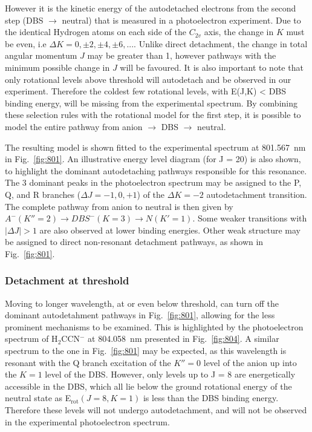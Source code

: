 \documentclass[journal=jpcafh,manuscript=article,layout=onecolumn, 12pt]{achemso}
\begin{document}
However it is the kinetic energy of the autodetached electrons from the second step (DBS $\rightarrow$ neutral) that is measured in a photoelectron experiment. Due to the identical Hydrogen atoms on each side of the $C_{2v}$ axis, the change in $K$ must be even, i.e $\Delta K = 0, \pm2, \pm4, \pm6,... $. Unlike direct detachment, the change in total angular momentum $J$ may be greater than 1, however pathways with the minimum possible change in $J$ will be favoured. It is also important to note that only rotational levels above threshold will autodetach and be observed in our experiment. Therefore the coldest few rotational levels, with E(J,K) < DBS binding energy, will be missing from the experimental spectrum. By combining these selection rules with the rotational model for the first step, it is possible to model the entire pathway from anion $\rightarrow$ DBS $\rightarrow$ neutral. 

The resulting model is shown fitted to the experimental spectrum at 801.567~nm in Fig.~\ref{fig:801}. An illustrative energy level diagram (for J = 20) is also shown, to highlight the dominant autodetaching pathways responsible for this resonance. The 3 dominant peaks in the photoelectron spectrum may be assigned to the P, Q, and R branches ($\Delta J = -1, 0 ,+1$) of the $\Delta K = -2$ autodetachment transition. The complete pathway from anion to neutral is then given by $A^-(K''=2)\rightarrow DBS^-(K=3) \rightarrow N(K'=1)$. Some weaker transitions with $|\Delta J| > 1$ are also observed at lower binding energies. Other weak structure may be assigned to direct non-resonant detachment pathways, as shown in Fig.~\ref{fig:801}.

\subsubsection{Detachment at threshold}
Moving to longer wavelength, at or even below threshold, can turn off the dominant autodetahment pathways in Fig.~\ref{fig:801}, allowing for the less prominent mechanisms to be examined. This is highlighted by the photoelectron spectrum of H$_2$CCN$^-$ at 804.058~nm presented in Fig.~\ref{fig:804}. A similar spectrum to the one in Fig.~\ref{fig:801} may be expected, as this wavelength is resonant with the Q branch excitation of the $K''=0$ level of the anion up into the $K=1$ level of the DBS. However, only levels up to J = 8 are energetically accessible in the DBS, which all lie below the ground rotational energy of the neutral state as E$_{\text{rot}}(J=8,K=1)$ is less than the DBS binding energy. Therefore these levels will not undergo autodetachment, and will not be observed in the experimental photoelectron spectrum.
\end{document}
